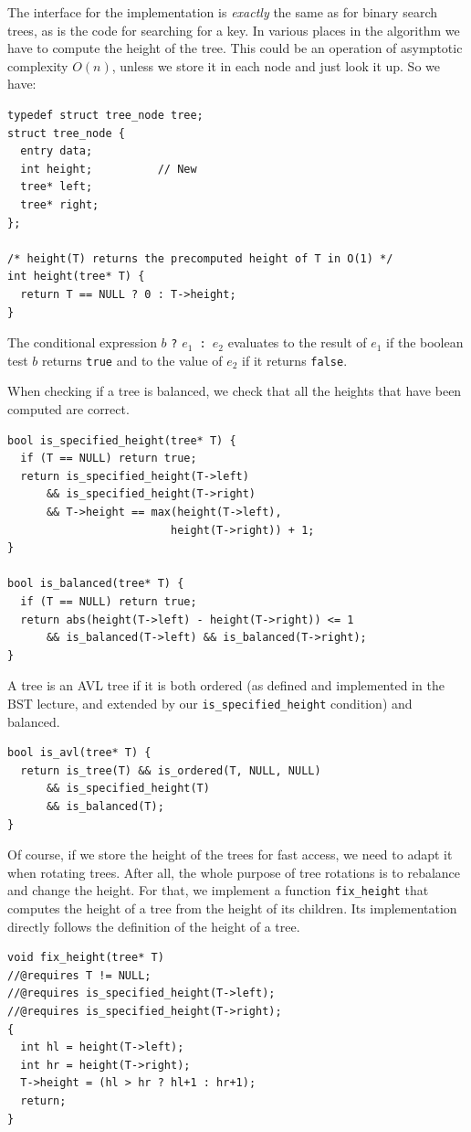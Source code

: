 The interface for the implementation is \emph{exactly} the same as for
binary search trees, as is the code for searching for a key.
In various places in the algorithm we have to compute the
height of the tree.  This could be an operation of asymptotic
complexity $O(n)$, unless we store it in each node and just
look it up.  So we have:

\begin{lstlisting}[language={[C0]C}]
typedef struct tree_node tree;
struct tree_node {
  entry data;
  int height;          // New
  tree* left;
  tree* right;
};

/* height(T) returns the precomputed height of T in O(1) */
int height(tree* T) {
  return T == NULL ? 0 : T->height;
}
\end{lstlisting}
The conditional expression %
$b$ \lstinline'?' $e_1 $\lstinline' : '$e_2$ %
evaluates to the result of $e_1$ if the boolean test $b$
returns \lstinline'true' and to the value of $e_2$ if it returns
\lstinline'false'.

When checking if a tree is balanced, we check that all the heights
that have been computed are correct.
\begin{lstlisting}[language={[C0]C}]
bool is_specified_height(tree* T) {
  if (T == NULL) return true;
  return is_specified_height(T->left)
      && is_specified_height(T->right)
      && T->height == max(height(T->left),
                         height(T->right)) + 1;
}

bool is_balanced(tree* T) {
  if (T == NULL) return true;
  return abs(height(T->left) - height(T->right)) <= 1
      && is_balanced(T->left) && is_balanced(T->right);
}
\end{lstlisting}

A tree is an AVL tree if it is both ordered (as defined and
implemented in the BST lecture, and extended by our
\lstinline'is_specified_height' condition) and balanced.
\begin{lstlisting}[language={[C0]C}]
bool is_avl(tree* T) {
  return is_tree(T) && is_ordered(T, NULL, NULL)
      && is_specified_height(T)
      && is_balanced(T);
}
\end{lstlisting}

Of course, if we store the height of the trees for fast access, we need to
adapt it when rotating trees.  After all, the whole purpose of tree rotations
is to rebalance and change the height.  For that, we implement a function
\lstinline'fix_height' that computes the height of a tree from the height of
its children.  Its implementation directly follows the definition of the
height of a tree.
\begin{lstlisting}[language={[C0]C}]
void fix_height(tree* T)
//@requires T != NULL;
//@requires is_specified_height(T->left);
//@requires is_specified_height(T->right);
{
  int hl = height(T->left);
  int hr = height(T->right);
  T->height = (hl > hr ? hl+1 : hr+1);
  return;
}
\end{lstlisting}

